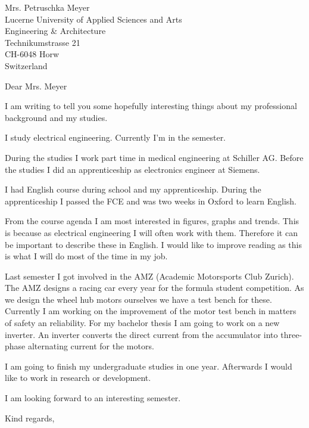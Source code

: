 \documentclass[a4paper]{letter}
\begin{document}
\begin{letter}{
    Mrs. Petruschka Meyer \\
    Lucerne University of Applied Sciences and Arts \\
    Engineering \& Architecture \\
    Technikumstrasse 21 \\
    CH-6048 Horw \\
    Switzerland}
\opening{Dear Mrs. Meyer}
I am writing to tell you some hopefully interesting things about my 
professional background and my studies. 

I study electrical engineering. Currently I'm in the  semester. 

During the studies I work part time in medical engineering at Schiller AG. 
Before the studies I did an apprenticeship as electronics engineer at Siemens. 

I had English course during school and my apprenticeship. During the 
apprenticeship I passed the FCE and was two weeks in Oxford to learn English. 

From the course agenda I am most interested in figures, graphs and trends. 
This is because as electrical engineering I will often work with them. 
Therefore it can be important to describe these in English. 
I would like to improve reading as this is what I will do most of the time in 
my job. 

Last semester I got involved in the AMZ (Academic Motorsports Club Zurich). 
The AMZ designs a racing car every year for the formula student competition. 
As we design the wheel hub motors ourselves we have a test bench for these. 
Currently I am working on the improvement of the motor test bench in matters 
of safety an reliability. For my bachelor thesis I am going to work on a new 
inverter. An inverter converts the direct current from the accumulator into 
three-phase alternating current for the motors. 

I am going to finish my undergraduate studies in one year. Afterwards I would 
like to work in research or development. 

I am looking forward to an interesting semester. 

\closing{Kind regards,}
\end{letter}
\end{document}
